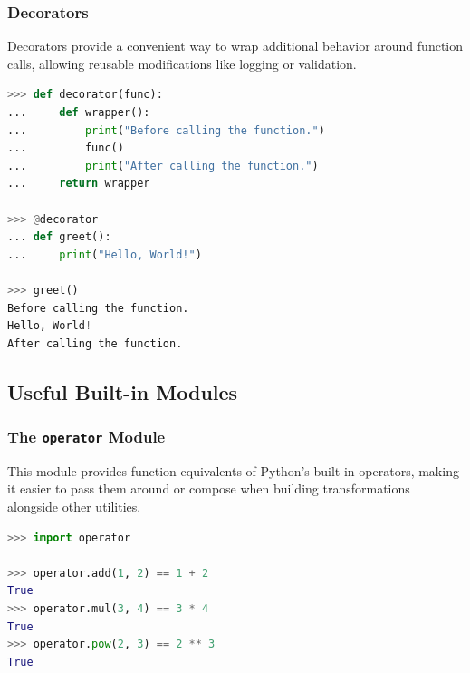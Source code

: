 \documentclass[envcountsect,10pt]{beamer}
\begin{document}
\begin{frame}[fragile]
    \frametitle{Decorators}

    Decorators provide a convenient way to wrap additional behavior around 
    function calls, allowing reusable modifications like logging or validation.

    \begin{lstlisting}[language=Python]
>>> def decorator(func):
...     def wrapper():
...         print("Before calling the function.")
...         func()
...         print("After calling the function.")
...     return wrapper

>>> @decorator
... def greet():
...     print("Hello, World!")

>>> greet()
Before calling the function.
Hello, World!
After calling the function.
    \end{lstlisting}

\end{frame}

\subsection{Useful Built-in Modules}

\begin{frame}[fragile]
    \frametitle{The \texttt{operator} Module}

    This module provides function equivalents of Python's built-in operators, 
    making it easier to pass them around or compose when building transformations alongside other utilities.

    \begin{lstlisting}[language=Python]
>>> import operator

>>> operator.add(1, 2) == 1 + 2
True
>>> operator.mul(3, 4) == 3 * 4
True
>>> operator.pow(2, 3) == 2 ** 3
True
    \end{lstlisting}

\end{frame}
\end{document}
